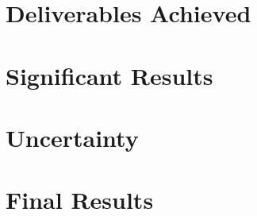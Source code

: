 \section{Deliverables Achieved}
\section{Significant Results}
\section{Uncertainty}
\section{Final Results}
